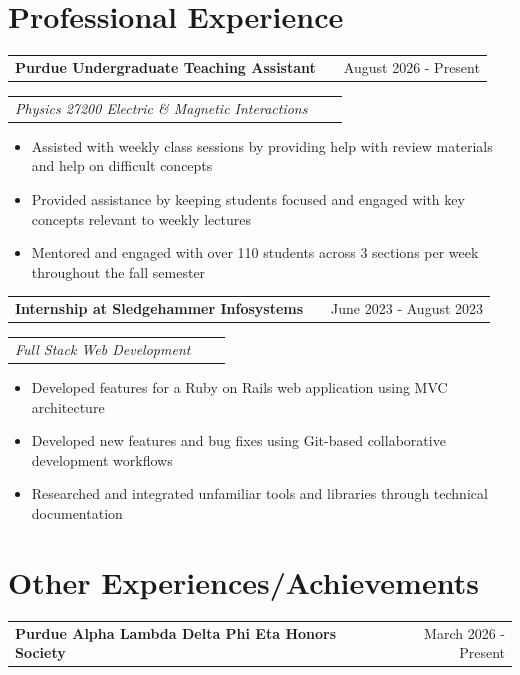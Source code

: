 \documentclass[letter, 10.5pt]{article}
\makeatletter
\newenvironment{job}[2]{%
    \begin{tabularx}{\linewidth}{@{}l X r@{}}%
        \textbf{#1} & \hfill & #2 \\%
    \end{tabularx}%
}{}
\newcommand{\jobdescription}[2]{%
    \begin{tabularx}{\linewidth}{@{}l X r@{}}%
        \footnotesize{\textit{#1}} &%
        \hfill &%
        \ifstrempty{#2}{}{\footnotesize{\textit{#2}}} \\%
    \end{tabularx}%
}
\makeatother
\begin{document}
\section{Professional Experience}

\begin{job}{Purdue Undergraduate Teaching Assistant}{August 2026 - Present}
    \vspace{-0.5em}
    \jobdescription{Physics 27200 Electric \& Magnetic Interactions}{West Lafayette, IN}
    \begin{itemize}
        \item Assisted with weekly class sessions by providing help with review materials and help on difficult concepts
        \item Provided assistance by keeping students focused and engaged with key concepts relevant to weekly lectures
        \item Mentored and engaged with over 110 students across 3 sections per week throughout the fall semester
    \end{itemize}
\end{job}

\begin{job}{Internship at Sledgehammer Infosystems}{June 2023 - August 2023}
    \vspace{-0.5em}
    \jobdescription{Full Stack Web Development}{West Lafayette, IN}
    \begin{itemize}
        \item Developed features for a Ruby on Rails web application using MVC architecture
        \item Developed new features and bug fixes using Git-based collaborative development workflows
        \item Researched and integrated unfamiliar tools and libraries through technical documentation
    \end{itemize}
\end{job}

\section{Other Experiences/Achievements}

\begin{job}{Purdue Alpha Lambda Delta Phi Eta Honors Society}{March 2026 - Present}
    \vspace{-1em}
\end{job}

\end{document}
